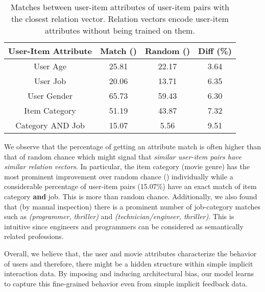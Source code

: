 \documentclass[sigconf]{acmart}
\begin{document}
\begin{table}[htbp]
  \centering
 \small
    \begin{tabular}{c|c|c|c}
    \midrule
    User-Item Attribute & Match ()  & Random () & Diff (\%)\\
    \midrule
    User Age   &   25.81    & 22.17 &  3.64\\
    User Job   &  20.06     & 13.71 & 6.35\\
    User Gender & 65.73      & 59.43 & 6.30\\
    Item Category & 51.19      & 43.87 & 7.32 \\
    Category AND Job &  15.07    & 5.56 & 9.51 \\
    \midrule
    \end{tabular}\caption{Matches between user-item attributes of user-item pairs with the closest relation vector. Relation vectors encode user-item attributes without being trained on them.}
  \label{tab:relation_match}\end{table}We observe that the percentage of getting an attribute match is often higher than that of random chance which might signal that \textit{similar user-item pairs have similar relation vectors}. In particular, the item category (movie genre) has the most prominent improvement over random chance () individually while a considerable percentage of user-item pairs (15.07\%) have an exact match of item category \textbf{and} job. This is  more than random chance. Additionally, we also found that (by manual inspection) there is a prominent number of job-category matches such as \textit{(programmer, thriller)} and \textit{(technician/engineer, thriller)}. This is intuitive since engineers and programmers can be considered as semantically related professions. 

Overall, we believe that, the user and movie attributes characterize the behavior of users and therefore, there might be a hidden structure within simple implicit interaction data. By imposing and inducing architectural bias, our model learns to capture this fine-grained behavior even from simple implicit feedback data. 
\end{document}
